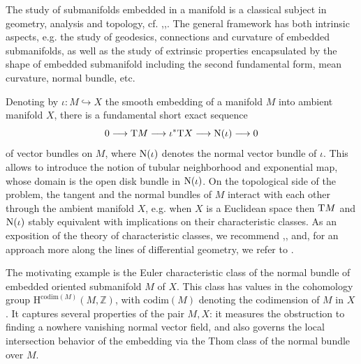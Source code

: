 
The study of submanifolds embedded in a manifold is a classical subject
in geometry, analysis and topology, cf. \cite{dajczer2019submanifold},\cite{lee2012smooth},\cite{tu2017differential}. The general
framework
has both intrinsic aspects, e.g. the study of geodesics, connections and
curvature
of embedded submanifolds, as well as the study of extrinsic properties
encapsulated by the
shape of embedded submanifold including the second fundamental form, mean
curvature, normal bundle, etc.

Denoting by $\iota: M\hookrightarrow X$ the smooth embedding of a manifold
$M$ into ambient manifold $X$, there is a fundamental short exact sequence
$$
0 \longrightarrow \mathrm{T}M \longrightarrow \iota^*\mathrm{T}X \longrightarrow \mathrm{N}(\iota)
\longrightarrow 0
$$
of vector bundles on $M$, where $\mathrm{N}(\iota)$ denotes the normal vector bundle of
$\iota$.
This allows to introduce the notion of tubular neighborhood and exponential
map, whose domain is the open disk bundle in $\mathrm{N}(\iota)$. On the topological side of
the problem, the tangent and the normal bundles of $M$ interact with each other 
through the ambient manifold $X$, e.g. when $X$ is a Euclidean space then 
$\mathrm{T}M$ and $\mathrm{N}(\iota)$ stably equivalent with implications on their characteristic 
classes. As an exposition of the theory of characteristic classes, we recommend \cite{hatcher2003vector},\cite{milnor1974characteristic}, and, for an approach more along the lines of differential geometry, we refer to \cite{tu2017differential}.

The motivating example is the Euler characteristic class of the normal
bundle
of embedded oriented submanifold $M$ of $X$. This class has values in the
cohomology group $\mathrm{H}^{\mathrm{codim}(M)}(M,{\mathbb Z})$, with $\mathrm{codim}(M)$ denoting
the codimension of $M$ in $X$. It captures several properties of
the pair $M, X$: it measures the obstruction to finding a nowhere vanishing
normal vector field, and also governs the local intersection behavior of the
embedding via the Thom class of the normal bundle over $M$.

